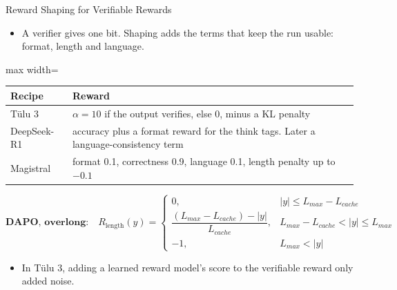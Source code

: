 \begin{frame}{Reward Shaping for Verifiable Rewards}
    \begin{itemize}\itemsep0.3em
        \item A verifier gives one bit. Shaping adds the terms that keep the run usable: format, length and language.
    \end{itemize}
    \begin{center}
    \small
    \begin{adjustbox}{max width=\linewidth}\begin{tabular}{l>{\raggedright\arraybackslash}p{10.4cm}}
        \toprule
        \textbf{Recipe} & \textbf{Reward} \\
        \midrule
        T\"ulu 3 & $\alpha=10$ if the output verifies, else 0, minus a KL penalty \\
        DeepSeek-R1 & accuracy plus a format reward for the think tags. Later a language-consistency term \\
        \rowcolor{KAUSTcyan!12} Magistral & format 0.1, correctness 0.9, language 0.1, length penalty up to $-0.1$ \\
        \bottomrule
    \end{tabular}\end{adjustbox}
    \end{center}
    \[
        \textbf{DAPO, overlong:}\quad
        R_{\text{length}}(y)=
        \begin{cases}
            0, & |y|\leq L_{max}-L_{cache}\\
            \dfrac{(L_{max}-L_{cache})-|y|}{L_{cache}}, & L_{max}-L_{cache}<|y|\leq L_{max}\\
            -1, & L_{max}<|y|
        \end{cases}
    \]
    \begin{itemize}\itemsep0.3em
        \item In T\"ulu 3, adding a learned reward model's score to the verifiable reward only added noise.
    \end{itemize}
\end{frame}

